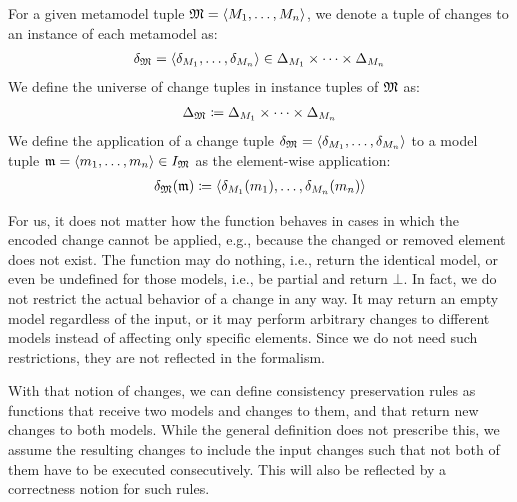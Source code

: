 \begin{definition}
    \label{def:changetuple}
    For a given metamodel tuple $\metamodeltuple{M} = \tupled{\metamodelsequence{M}{n}}$, we denote a tuple of changes to an instance of each metamodel as:
    \begin{align*}
        \changetuple{\metamodeltuple{M}} = \tupled{\change{\metamodel{M}{1}}, \dots, \change{\metamodel{M}{n}}} \in \changeuniverse{\metamodel{M}{1}} \times \dots \times \changeuniverse{\metamodel{M}{n}}
    \end{align*}
    We define the universe of change tuples in instance tuples of 
    $\metamodeltuple{M}$ as:
    \begin{align*}
        \changeuniverse{\metamodeltuple{M}} \equalsperdefinition \changeuniverse{\metamodel{M}{1}} \times \dots \times \changeuniverse{\metamodel{M}{n}}
    \end{align*}
    We define the application of a change tuple $\changetuple{\metamodeltuple{M}} = \tupled{\change{\metamodel{M}{1}}, \dots, \change{\metamodel{M}{n}}}$ to a model tuple $\modeltuple{m} = \tupled{\modelsequence{m}{n}} \in \metamodeltupleinstanceset{M}$ as the element-wise application:
    \begin{align*}
        \changetuple{\metamodeltuple{M}}(\modeltuple{m}) \equalsperdefinition \tupled{\change{\metamodel{M}{1}}(\model{m}{1}), \dots, \change{\metamodel{M}{n}}(\model{m}{n})}
    \end{align*}
\end{definition}

For us, it does not matter how the function behaves in cases in which the encoded change cannot be applied, e.g., because the changed or removed element does not exist. The function may do nothing, i.e., return the identical model, or even be undefined for those models, i.e., be partial and return $\bot$.
%
In fact, we do not restrict the actual behavior of a change in any way.
It may return an empty model regardless of the input, or it may perform arbitrary changes to different models instead of affecting only specific elements.
Since we do not need such restrictions, they are not reflected in the formalism.

With that notion of changes, we can define consistency preservation rules as functions that receive two models and changes to them, and that return new changes to both models.
While the general definition does not prescribe this, we assume the resulting changes to include the input changes such that not both of them have to be executed consecutively.
This will also be reflected by a correctness notion for such rules.

